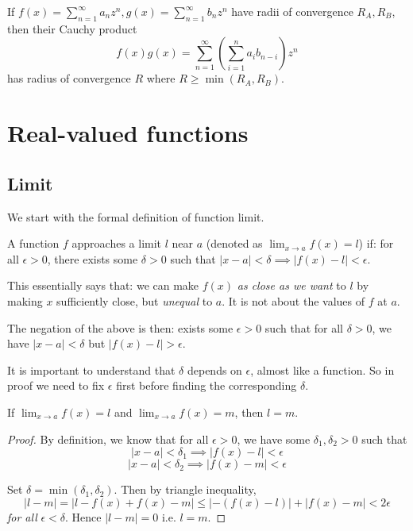 \documentclass[11pt]{article}
\begin{document}
\begin{theorem}
  If \(f(x)=\sum_{n=1}^\infty a_nz^n,g(x)=\sum_{n=1}^\infty b_nz^n\) have radii of convergence \(R_A,R_B\), then their Cauchy product \[f(x)g(x)=\sum_{n=1}^{\infty} \left(\sum_{i=1}^{n}a_ib_{n-i}\right) z^n\] has radius of convergence \(R\) where \(R\geq\min(R_A,R_B)\).
\end{theorem}

\pagebreak
\section{Real-valued functions}
\subsection{Limit}
We start with the formal definition of function limit.
\begin{definition}[\(\epsilon-\delta\)]
  A function \(f\) approaches a limit \(l\) near \(a\) (denoted as \(\lim_{x\to a}f(x) =l\)) if: for all \(\epsilon>0\), there exists some \(\delta >0\) such that \(|x-a|<\delta \implies |f(x)-l|<\epsilon\).
\end{definition}
This essentially says that: we can make \(f(x)\) \emph{as close as we want} to \(l\) by making \(x\) sufficiently close, but \emph{unequal} to \(a\). It is not about the values of \(f\) at \(a\).

The negation of the above is then: exists some \(\epsilon>0\) such that for all \(\delta >0\), we have \(|x-a|<\delta\) but \(|f(x)-l|>\epsilon\).

It is important to understand that \(\delta\) depends on \(\epsilon\), almost like a function. So in proof we need to fix \(\epsilon\) first before finding the corresponding \(\delta\).

\begin{theorem}[Uniqueness]
  If \(\lim_{x\to a}f(x) = l\) and \(\lim_{x\to a}f(x)=m\), then \(l=m\).
\end{theorem}
\begin{proof}
  By definition, we know that for all \(\epsilon>0\), we have some \(\delta_1,\delta_2>0\) such that 
  \[|x-a|<\delta_1\implies|f(x)-l|<\epsilon\]
  \[|x-a|<\delta_2\implies|f(x)-m|<\epsilon\]

  Set \(\delta = \min(\delta_1,\delta_2)\). Then by triangle inequality,
  \[|l-m|=|l-f(x)+f(x)-m|\leq|-(f(x)-l)|+|f(x)-m|<2\epsilon\]
  \emph{for all} \(\epsilon<\delta\). Hence \(|l-m|=0\) i.e. \(l=m\).
\end{proof}
\end{document}
